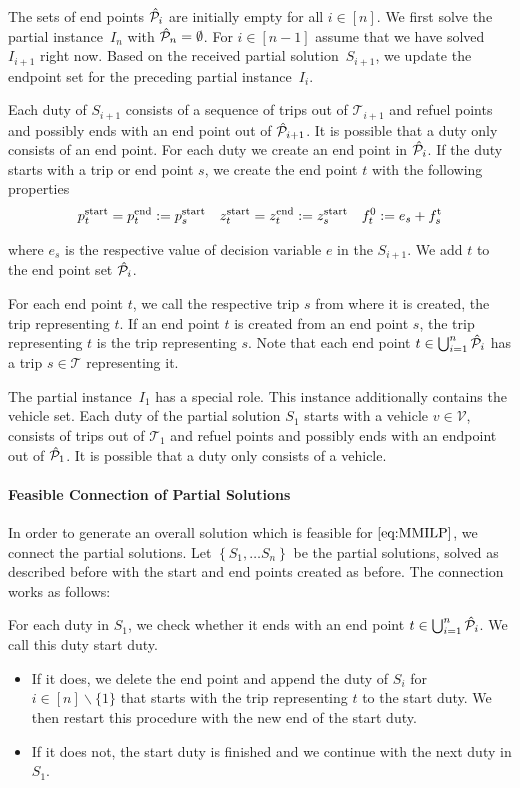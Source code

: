 The sets of end points $\hat{\mathcal{P}}_i$ are initially empty for all $i\in[n]$. We first solve the partial instance~$I_n$ with ${\hat{\mathcal{P}}_n = \emptyset}$. For ${i\in[n-1]}$ assume that we have solved $I_{i+1}$ right now. Based on the received partial solution~$S_{i+1}$, we update the endpoint set for the preceding partial instance~$I_i$.

Each duty of $S_{i+1}$ consists of a sequence of trips out of $\mathcal{T}_{i+1}$ and refuel points and possibly ends with an end point out of $\hat{\mathcal{P}}_{i+1}$. It is possible that a duty only consists of an end point. For each duty we create an end point in $\hat{\mathcal{P}}_i$. If the duty starts with a trip or end point $s$, we create the end point $t$ with the following properties
\begin{align*}
	p^{\operatorname{start}}_t = p^{\operatorname{end}}_t := p^{\operatorname{start}}_s && z^{\operatorname{start}}_t = z^{\operatorname{end}}_t := z^{\operatorname{start}}_s && f_t^0 := e_s + f^{\operatorname{t}}_s
\end{align*}

where $e_s$ is the respective value of decision variable $e$ in the $S_{i+1}$. We add $t$ to the end point set $\hat{\mathcal{P}}_i$.

For each end point $t$, we call the respective trip $s$ from where it is created, the trip representing $t$. If an end point $t$ is created from an end point $s$, the trip representing $t$ is the trip representing $s$. Note that each end point ${t\in\bigcup_{i=1}^n\hat{\mathcal{P}}_i}$ has a trip ${s\in\mathcal{T}}$ representing it.

The partial instance~$I_1$ has a special role. This instance additionally contains the vehicle set. Each duty of the partial solution $S_1$ starts with a vehicle $v\in\mathcal{V}$, consists of trips out of $\mathcal{T}_1$ and refuel points and possibly ends with an endpoint out of $\hat{\mathcal{P}}_1$. It is possible that a duty only consists of a vehicle.

\paragraph{Feasible Connection of Partial Solutions} \parfill

In order to generate an overall solution which is feasible for $\eqref{eq:MMILP}$, we connect the partial solutions. Let ${\left\{S_1,\dots S_n\right\}}$ be the partial solutions, solved as described before with the start and end points created as before. The connection works as follows:

For each duty in $S_1$, we check whether it ends with an end point $t\in\bigcup_{i=1}^n\hat{\mathcal{P}}_i$. We call this duty start duty.
\begin{itemize}
	\item
		If it does, we delete the end point and append the duty of $S_i$ for ${i\in[n]\backslash\{1\}}$ that starts with the trip representing $t$ to the start duty. We then restart this procedure with the new end of the start duty.
	\item
		If it does not, the start duty is finished and we continue with the next duty in $S_1$.
\end{itemize}

